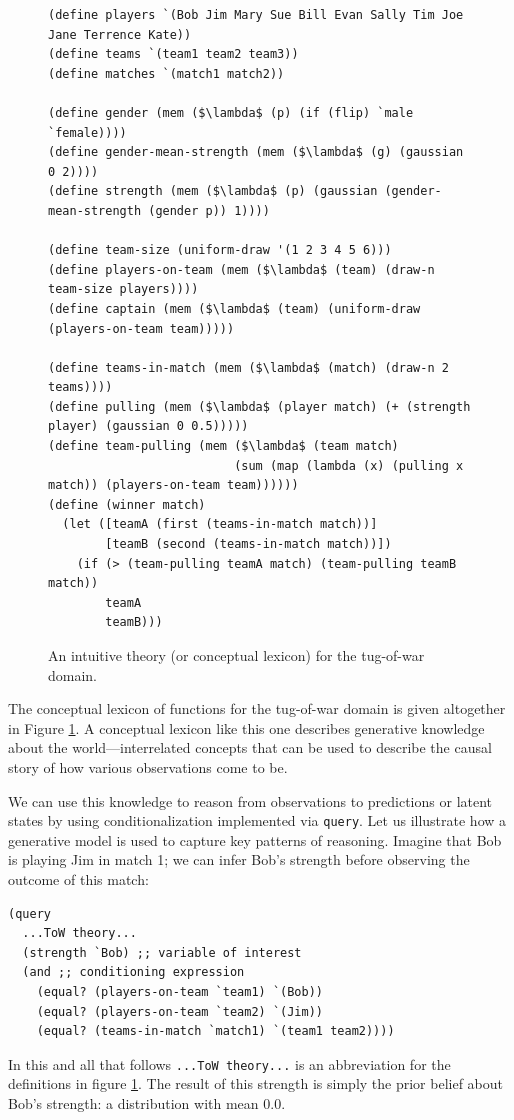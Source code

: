 \documentclass[12pt]{article}
\begin{document}
 \begin{figure}[tbh]
\begin{center}
 \begin{lstlisting}[mathescape]
(define players `(Bob Jim Mary Sue Bill Evan Sally Tim Joe Jane Terrence Kate))
(define teams `(team1 team2 team3))
(define matches `(match1 match2))

(define gender (mem ($\lambda$ (p) (if (flip) `male `female))))
(define gender-mean-strength (mem ($\lambda$ (g) (gaussian 0 2))))
(define strength (mem ($\lambda$ (p) (gaussian (gender-mean-strength (gender p)) 1))))

(define team-size (uniform-draw '(1 2 3 4 5 6)))
(define players-on-team (mem ($\lambda$ (team) (draw-n team-size players))))
(define captain (mem ($\lambda$ (team) (uniform-draw (players-on-team team)))))

(define teams-in-match (mem ($\lambda$ (match) (draw-n 2 teams))))
(define pulling (mem ($\lambda$ (player match) (+ (strength player) (gaussian 0 0.5)))))
(define team-pulling (mem ($\lambda$ (team match) 
                          (sum (map (lambda (x) (pulling x match)) (players-on-team team))))))
(define (winner match) 
  (let ([teamA (first (teams-in-match match))]
        [teamB (second (teams-in-match match))])
    (if (> (team-pulling teamA match) (team-pulling teamB match))
        teamA
        teamB)))
\end{lstlisting}
\caption{An intuitive theory (or conceptual lexicon) for the tug-of-war domain.}
\label{theory}
\end{center}
\end{figure}  

The conceptual lexicon of functions for the tug-of-war domain is given altogether in Figure \ref{theory}.
A conceptual lexicon like this one describes generative knowledge about the world---interrelated concepts that can be used to describe the causal story of how various observations come to be. 

We can use this knowledge to reason from observations to predictions or latent states by using conditionalization implemented via \lstinline{query}. 
Let us illustrate how a generative model is used to capture key patterns of reasoning. 
Imagine that Bob is playing Jim in match 1; we can infer Bob's strength before observing the outcome of this match:
\begin{lstlisting}[mathescape]
(query
  ...ToW theory...
  (strength `Bob) ;; variable of interest
  (and ;; conditioning expression 
    (equal? (players-on-team `team1) `(Bob))
    (equal? (players-on-team `team2) `(Jim))
    (equal? (teams-in-match `match1) `(team1 team2))))
\end{lstlisting}
In this and all that follows \lstinline{...ToW theory...} is an abbreviation for the definitions in figure \ref{theory}. 
The result of this strength is simply the prior belief about Bob's strength: a distribution with mean 0.0.
\end{document}
